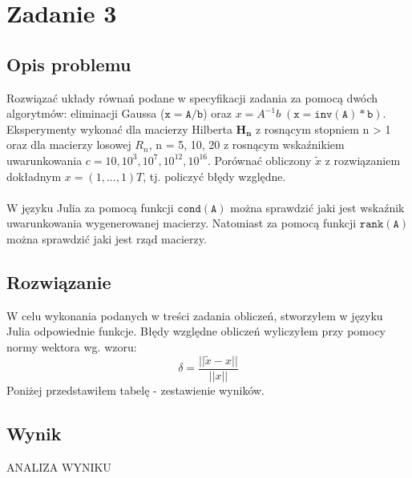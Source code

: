 \section{Zadanie 3}
\subsection{Opis problemu}
Rozwiązać układy równań podane w specyfikacji zadania za pomocą dwóch algorytmów: eliminacji Gaussa ($ \mathtt{x=A/b} $) oraz $ x = A^{-1}b\; (\mathtt{x=inv(A)*b}) $. Eksperymenty wykonać dla macierzy Hilberta $\mathbf{H_n}$ z rosnącym stopniem n > 1 oraz dla macierzy losowej $R_n$, n = 5, 10, 20 z rosnącym wskaźnikiem uwarunkowania $ c = 10, 10^3, 10^7, 10^{12}, 10^{16} $. Porównać obliczony $\tilde{x}$ z rozwiązaniem dokładnym $ x = (1, . . . , 1)T $, tj. policzyć błędy względne. \\ \\
W języku Julia za pomocą funkcji $ \mathtt{cond(A)} $ można sprawdzić jaki jest wskaźnik uwarunkowania wygenerowanej macierzy. Natomiast za pomocą funkcji $ \mathtt{rank(A)} $ można sprawdzić jaki jest rząd macierzy.
\subsection{Rozwiązanie}
W celu wykonania podanych w treści zadania obliczeń, stworzyłem w języku Julia odpowiednie funkcje. Błędy względne obliczeń wyliczyłem przy pomocy normy wektora wg. wzoru:
$$ \delta = \frac{|| \widetilde{x} - x ||}{||x||} $$
Poniżej przedstawiłem tabelę - zestawienie wyników.
\subsection{Wynik}
\begin{center}

\end{center}

ANALIZA WYNIKU
